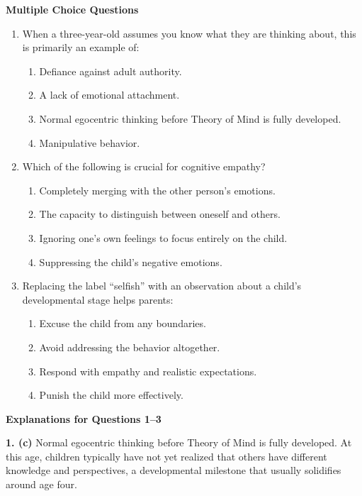 \begin{practiceexercise}
\textbf{Multiple Choice Questions}
\begin{enumerate}
  \item When a three-year-old assumes you know what they are thinking about, this is primarily an example of:
  \begin{enumerate}
    \item Defiance against adult authority.
    \item A lack of emotional attachment.
    \item Normal egocentric thinking before Theory of Mind is fully developed.
    \item Manipulative behavior.
  \end{enumerate}
  \vspace{\fill}
  \item Which of the following is crucial for cognitive empathy?
  \begin{enumerate}
    \item Completely merging with the other person's emotions.
    \item The capacity to distinguish between oneself and others.
    \item Ignoring one's own feelings to focus entirely on the child.
    \item Suppressing the child's negative emotions.
  \end{enumerate}
  \vspace{\fill}
  \item Replacing the label ``selfish'' with an observation about a child's developmental stage helps parents:
  \begin{enumerate}
    \item Excuse the child from any boundaries.
    \item Avoid addressing the behavior altogether.
    \item Respond with empathy and realistic expectations.
    \item Punish the child more effectively.
  \end{enumerate}
\end{enumerate}
\vspace{\fill}
\newpage

\textbf{Explanations for Questions 1--3}

\textbf{1. (c)} Normal egocentric thinking before Theory of Mind is fully developed. At this age, children typically have not yet realized that others have different knowledge and perspectives, a developmental milestone that usually solidifies around age four.


\end{practiceexercise}
